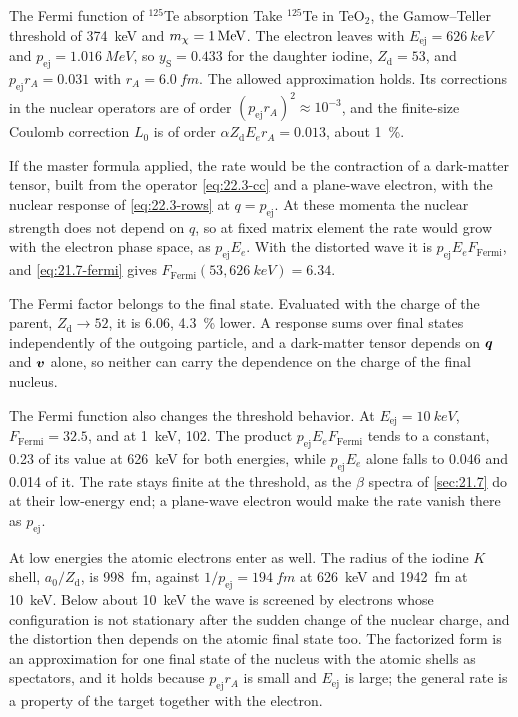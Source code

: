 \begin{workedexample}{The Fermi function of $^{125}$Te absorption}\label{we:22-cc}
Take $^{125}$Te in TeO$_2$, the Gamow--Teller threshold of \SI{374}{keV} and $m_{\chi} = \SI{1}{MeV}$. The electron leaves with $E_{\mathrm{ej}} = \SI{626}{keV}$ and $p_{\mathrm{ej}} = \SI{1.016}{MeV}$, so $y_{\mathrm{S}} = 0.433$ for the daughter iodine, $Z_{\mathrm{d}} = 53$, and $p_{\mathrm{ej}}r_A = 0.031$ with $r_A = \SI{6.0}{fm}$. The allowed approximation holds. Its corrections in the nuclear operators are of order $(p_{\mathrm{ej}}r_A)^2 \approx 10^{-3}$, and the finite-size Coulomb correction $L_0$ is of order $\alpha Z_{\mathrm{d}}E_er_A = 0.013$, about \SI{1}{\percent}.

If the master formula applied, the rate would be the contraction of a dark-matter tensor, built from the operator \cref{eq:22.3-cc} and a plane-wave electron, with the nuclear response of \cref{eq:22.3-rows} at $q = p_{\mathrm{ej}}$. At these momenta the nuclear strength does not depend on $q$, so at fixed matrix element the rate would grow with the electron phase space, as $p_{\mathrm{ej}}E_e$. With the distorted wave it is $p_{\mathrm{ej}}E_eF_{\mathrm{Fermi}}$, and \cref{eq:21.7-fermi} gives $F_{\mathrm{Fermi}}(53, \SI{626}{keV}) = 6.34$.

The Fermi factor belongs to the final state. Evaluated with the charge of the parent, $Z_{\mathrm{d}} \to 52$, it is 6.06, \SI{4.3}{\percent} lower. A response sums over final states independently of the outgoing particle, and a dark-matter tensor depends on $\bm{q}$ and $\bm{v}$ alone, so neither can carry the dependence on the charge of the final nucleus.

The Fermi function also changes the threshold behavior. At $E_{\mathrm{ej}} = \SI{10}{keV}$, $F_{\mathrm{Fermi}} = 32.5$, and at \SI{1}{keV}, 102. The product $p_{\mathrm{ej}}E_eF_{\mathrm{Fermi}}$ tends to a constant, 0.23 of its value at \SI{626}{keV} for both energies, while $p_{\mathrm{ej}}E_e$ alone falls to 0.046 and 0.014 of it. The rate stays finite at the threshold, as the $\beta$ spectra of \cref{sec:21.7} do at their low-energy end; a plane-wave electron would make the rate vanish there as $p_{\mathrm{ej}}$.

At low energies the atomic electrons enter as well. The radius of the iodine $K$ shell, $a_0/Z_{\mathrm{d}}$, is \SI{998}{fm}, against $1/p_{\mathrm{ej}} = \SI{194}{fm}$ at \SI{626}{keV} and \SI{1942}{fm} at \SI{10}{keV}. Below about \SI{10}{keV} the wave is screened by electrons whose configuration is not stationary after the sudden change of the nuclear charge, and the distortion then depends on the atomic final state too. The factorized form is an approximation for one final state of the nucleus with the atomic shells as spectators, and it holds because $p_{\mathrm{ej}}r_A$ is small and $E_{\mathrm{ej}}$ is large; the general rate is a property of the target together with the electron.
\end{workedexample}

